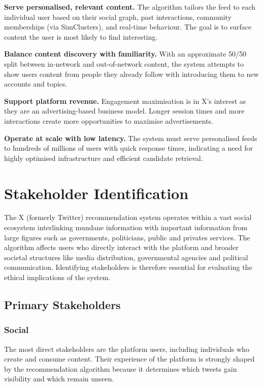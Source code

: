 \documentclass[]
{UCD_CS_41820_Report}
\begin{document}
\textbf{Serve personalised, relevant content.} The algorithm tailors the feed to each individual user based on their social graph, past interactions, community memberships (via SimClusters), and real-time behaviour. The goal is to surface content the user is most likely to find interesting.

\textbf{Balance content discovery with familiarity.} With an approximate 50/50 split between in-network and out-of-network content, the system attempts to show users content from people they already follow with introducing them to new accounts and topics.

\textbf{Support platform revenue.} Engagement maximisation is in X's interest as they are an advertising-based business model. Longer session times and more interactions create more opportunities to maximise advertisements.

\textbf{Operate at scale with low latency.} The system must serve personalised feeds to hundreds of millions of users with quick response times, indicating a need for highly optimised infrastructure and efficient candidate retrieval.


\chapter{Stakeholder Identification}

The X (formerly Twitter) recommendation system operates within a vast social ecosystem interlinking mundane information with important information from large figures such as governments, politicians, public and privates services. 
The algorithm affects users who directly interact with the platform and broader 
societal structures like media distribution, governmental agencies and political communication. 
Identifying stakeholders is therefore essential for evaluating the ethical implications of the system.

\section{Primary Stakeholders}

\subsection{Social}
The most direct stakeholders are the platform users, including individuals who create and consume 
content. Their experience of the platform is strongly shaped by the recommendation algorithm because 
it determines which tweets gain visibility and which remain unseen.
\end{document}
